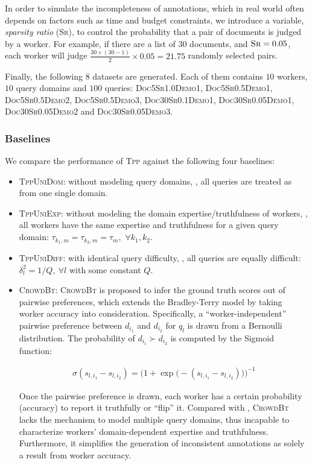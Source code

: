 In order to simulate the incompleteness of annotations, which in real world
often depends on factors such as time and budget constraints, we introduce a
variable, \emph{sparsity ratio} (\textsc{Sr}), to control the probability that a
pair of documents is judged by a worker.  For example, if there are a list of
$30$ documents, and $\textsc{Sr} = 0.05$, each worker will judge $\frac{30\times
(30-1)}{2} \times 0.05 = 21.75$ randomly selected pairs.

Finally, the following $8$ datasets are generated. Each of them contains $10$
workers, $10$ query domains and $100$ queries:  \textsc{Doc5Sr1.0Demo1,
Doc5Sr0.5Demo1}, \textsc{Doc5Sr0.5Demo2}, \textsc{Doc5Sr0.5Demo3},
\textsc{Doc30Sr0.1Demo1}, \textsc{Doc30Sr0.05Demo1}, \textsc{Doc30Sr0.05Demo2}
and \textsc{Doc30Sr0.05Demo3}.

\subsubsection{Baselines}
We compare the performance of \textsc{Tpp} against the following four baselines:
\begin{itemize}
\item \textsc{TppUniDom}: \tpp{} without modeling query domains, \ie, all
  queries are treated as from one single domain.
\item \textsc{TppUniExp}: \tpp{} without modeling the domain
  expertise/truthfulness of workers, \ie, all workers have the same expertise
  and truthfulness for a given query domain: $\tau_{k_1,m} = \tau_{k_2, m} =
  \tau_m,$ $\forall k_1, k_2$.
\item \textsc{TppUniDiff}: \tpp{} with identical query difficulty, \ie, all
  queries are equally difficult: $\delta_l^2 = 1/Q,~ \forall l$ with some
  constant $Q$.
\item \textsc{CrowdBt}: \textsc{CrowdBt} \cite{chen2013pairwise} is proposed to
  infer the ground truth scores out of pairwise preferences, which extends the
  Bradley-Terry model by taking worker accuracy into consideration.
  Specifically, a ``worker-independent'' pairwise preference between $d_{i_1}$
  and $d_{i_2}$ for $q_l$ is drawn from a Bernoulli distribution. The
  probability of $d_{i_1} \succ d_{i_2}$ is computed by the Sigmoid function:

  \begin{align}
  \sigma( s_{l, i_1} - s_{l, i_2}) =
    \Big( 1 + \exp\big( -\left(s_{l, i_1} - s_{l, i_2}\right) \big) \Big)^{-1}
    \nonumber
  \end{align}

  Once the pairwise preference is drawn, each worker has a certain probability
  (accuracy) to report it truthfully or ``flip'' it. Compared with \tpp{},
  \textsc{CrowdBt} lacks the mechanism to model multiple query domains, thus
  incapable to characterize workers' domain-dependent expertise and
  truthfulness. Furthermore, it simplifies the generation of inconsistent
  annotations as solely a result from worker accuracy.
\end{itemize}

